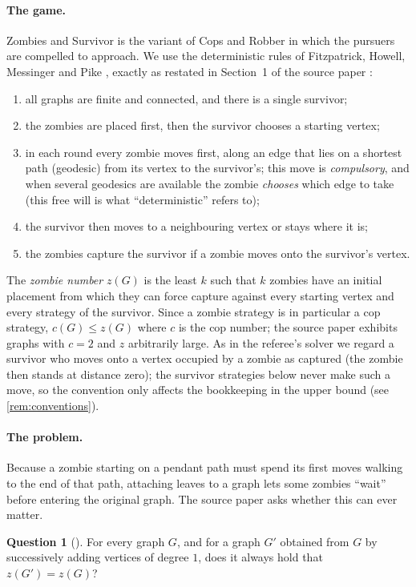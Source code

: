 \documentclass[11pt,a4paper]{article}
\theoremstyle{plain}
\theoremstyle{definition}
\newtheorem{question}[theorem]{Question}
\theoremstyle{remark}
\providecommand{\tightlist}{\setlength{\itemsep}{0pt}\setlength{\parskip}{0pt}}
\begin{document}
\paragraph{The game.} Zombies and Survivor is the variant of Cops and Robber in which the pursuers are compelled to approach. We use the deterministic rules of Fitzpatrick, Howell, Messinger and Pike \cite{FHMP16}, exactly as restated in Section~1 of the source paper \cite{BBBLN21}:
\begin{enumerate}[label=(R\arabic*)]\tightlist
\item all graphs are finite and connected, and there is a single survivor;
\item the zombies are placed first, then the survivor chooses a starting vertex;
\item in each round every zombie moves first, along an edge that lies on a shortest path (geodesic) from its vertex to the survivor's; this move is \emph{compulsory}, and when several geodesics are available the zombie \emph{chooses} which edge to take (this free will is what ``deterministic'' refers to);
\item the survivor then moves to a neighbouring vertex or stays where it is;
\item the zombies capture the survivor if a zombie moves onto the survivor's vertex.
\end{enumerate}
The \emph{zombie number} $z(G)$ is the least $k$ such that $k$ zombies have an initial placement from which they can force capture against every starting vertex and every strategy of the survivor. Since a zombie strategy is in particular a cop strategy, $c(G)\le z(G)$ where $c$ is the cop number; the source paper exhibits graphs with $c=2$ and $z$ arbitrarily large. As in the referee's solver we regard a survivor who moves onto a vertex occupied by a zombie as captured (the zombie then stands at distance zero); the survivor strategies below never make such a move, so the convention only affects the bookkeeping in the upper bound (see \cref{rem:conventions}).

\paragraph{The problem.} Because a zombie starting on a pendant path must spend its first moves walking to the end of that path, attaching leaves to a graph lets some zombies ``wait'' before entering the original graph. The source paper asks whether this can ever matter.

\begin{question}[{\cite[Question~4.1]{BBBLN21}}]\label{q:main}
For every graph $G$, and for a graph $G'$ obtained from $G$ by successively adding vertices of degree $1$, does it always hold that $z(G')=z(G)$?
\end{question}
\end{document}
